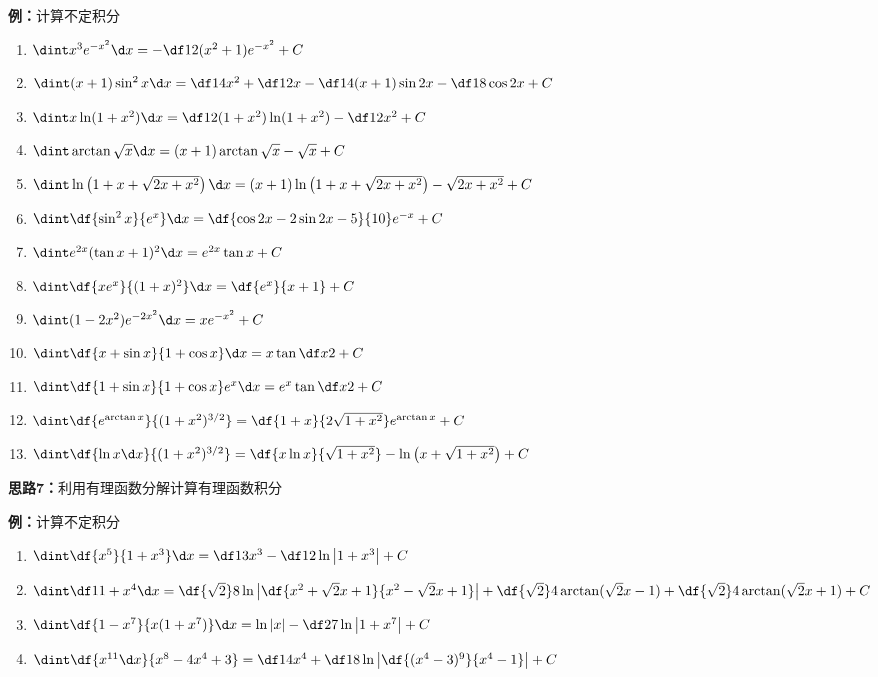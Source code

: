 {\bf 例：}计算不定积分
\begin{enumerate}[(1)]
  \setlength{\itemindent}{1cm}
  \item $\dint x^3e^{-x^2}\d x=-\df12(x^2+1)e^{-x^2}+C$
  \item $\dint (x+1)\sin^2x\d x=\df14x^2+\df12x-\df14(x+1)\sin 2x-
  \df18\cos2x+C$
  \item $\dint x\ln(1+x^2)\d x=\df12(1+x^2)\ln(1+x^2)-\df12x^2+C$
  \item $\dint\arctan\sqrt x\d x=(x+1)\arctan\sqrt x-\sqrt x+C$
  \item $\dint\ln\left(1+x+\sqrt{2x+x^2}\right)\d
  x=(x+1)\ln\left(1+x+\sqrt{2x+x^2}\right)-\sqrt{2x+x^2}+C$
  \item $\dint\df{\sin^2x}{e^x}\d x=\df{\cos2x-2\sin2x-5}{10}e^{-x}+C$
  \item $\dint e^{2x}(\tan x+1)^2\d x=e^{2x}\tan x+C$
  \item $\dint\df{xe^x}{(1+x)^2}\d x=\df{e^x}{x+1}+C$
  \item $\dint(1-2x^2)e^{-2x^2}\d x=xe^{-x^2}+C$
  \item $\dint\df{x+\sin x}{1+\cos x}\d x=x\tan\df x2+C$
  \item $\dint\df{1+\sin x}{1+\cos x}e^x\d x=e^x\tan\df x2+C$
  \item $\dint\df{e^{\arctan x}}{(1+x^2)^{3/2}}=\df{1+x}{2\sqrt{1+x^2}}
  e^{\arctan x}+C$
  \item $\dint\df{\ln x\d x}{(1+x^2)^{3/2}}=\df{x\ln x}{\sqrt{1+x^2}}
  -\ln\left(x+\sqrt{1+x^2}\right)+C$
\end{enumerate}

\begin{shaded}
{\bf 思路7：}利用有理函数分解计算有理函数积分
\end{shaded}

{\bf 例：}计算不定积分
\begin{enumerate}[(1)]
  \setlength{\itemindent}{1cm}
  \item $\dint\df{x^5}{1+x^3}\d x=\df13x^3-\df12\ln\left|1+x^3\right|+C$
  \item $\dint\df1{1+x^4}\d x=\df{\sqrt 2}8\ln\left|
  \df{x^2+\sqrt2x+1}{x^2-\sqrt2x+1}\right|+\df{\sqrt 2}4\arctan(\sqrt2x-1)
  +\df{\sqrt2}4\arctan(\sqrt2x+1)+C$
  \item $\dint\df{1-x^7}{x(1+x^7)}\d x=\ln|x|-\df27\ln\left|1+x^7\right|+C$
  \item $\dint\df{x^{11}\d x}{x^8-4x^4+3}=\df14x^4+\df18
  \ln\left|\df{(x^4-3)^9}{x^4-1}\right|+C$
\end{enumerate}

